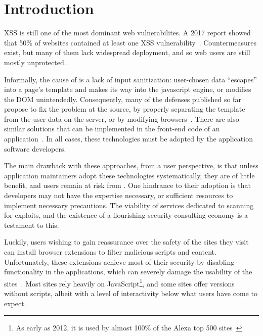 \section{Introduction} \label{introduction}

\ac{XSS} is still one of the most dominant web vulnerabilites. A 2017
report showed that 50\% of websites contained at least one \ac{XSS}
vulnerability~\cite{Acunetix}. Countermeasures exist, but many of them
lack widespread deployment, and so web users are still mostly
unprotected.

Informally, the cause of \xss is a lack of input sanitization:
user-chosen data ``escapes'' into a page's template and makes its way
into the javascript engine, or modifies the DOM
unintendedly.
%
Consequently, many of the \xss defenses published so far
propose to fix the problem at the source, by properly separating the
template from the user data on the server, or by modifying
browsers~\cite{Jim:2007:DSI:1242572.1242654,Nadji:2009,Wurzinger:2009:SMX:1656360.1656379,Sundareswaran:2012:XHS:2352970.2352994}.
%
There are also similar solutions that can be implemented in the
front-end code of an application~\cite{10.1007/978-3-319-66399-9_7}.
In all cases, these technologies must be adopted by the application
software developers.

The main drawback with these approaches, from a user perspective, is
that unless application maintainers adopt these technologies
systematically, they are of little benefit, and users remain at risk
from \xss. One hindrance to their adoption is that developers may not have the
expertise necessary, or sufficient resources to implement necessary
precautions.
The viability of services dedicated to scanning for exploits,
and the existence of a flourishing security-consulting economy is a testament
to this.


Luckily, users wishing to gain reassurance over the safety of the
sites they visit can install browser extensions to filter malicious
scripts and content. Unfortunately, these extensions achieve most of
their security by disabling functionality in the applications, which
can severely damage the usability of the
sites~\cite{Noscript,Snyder:2017:MWD:3133956.3133966}. Most sites rely
heavily on JavaScript\footnote{As early as 2012, it is used by almost
  100\% of the Alexa top 500
  sites~\cite{Stock:2017:WTI:3241189.3241265}}, and some sites offer
versions without scripts, albeit with a level of interactivity below
what users have come to expect.

